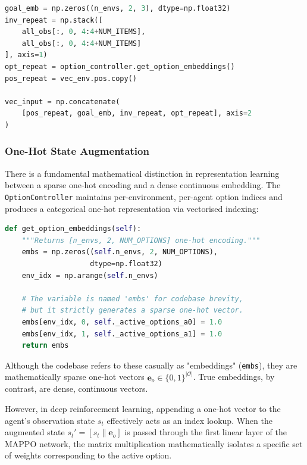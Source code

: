 \begin{lstlisting}[style=code, language=Python, caption={Observation construction in \texttt{hrl\_train\_loop.py}.}, label={lst:hrl_obs}]
goal_emb = np.zeros((n_envs, 2, 3), dtype=np.float32)
inv_repeat = np.stack([
    all_obs[:, 0, 4:4+NUM_ITEMS],
    all_obs[:, 0, 4:4+NUM_ITEMS]
], axis=1)
opt_repeat = option_controller.get_option_embeddings()
pos_repeat = vec_env.pos.copy()

vec_input = np.concatenate(
    [pos_repeat, goal_emb, inv_repeat, opt_repeat], axis=2
)
\end{lstlisting}

\subsubsection{One-Hot State Augmentation}

There is a fundamental mathematical distinction in representation learning between a sparse one-hot encoding and a dense continuous embedding. The \texttt{OptionController} maintains per-environment, per-agent option indices and produces a categorical one-hot representation via vectorised indexing:

\begin{lstlisting}[style=code, language=Python, caption={One-hot state augmentation in \texttt{option\_controller.py}.}, label={lst:onehot_gen}]
def get_option_embeddings(self):
    """Returns [n_envs, 2, NUM_OPTIONS] one-hot encoding."""
    embs = np.zeros((self.n_envs, 2, NUM_OPTIONS),
                    dtype=np.float32)
    env_idx = np.arange(self.n_envs)
    
    # The variable is named 'embs' for codebase brevity, 
    # but it strictly generates a sparse one-hot vector.
    embs[env_idx, 0, self._active_options_a0] = 1.0
    embs[env_idx, 1, self._active_options_a1] = 1.0
    return embs
\end{lstlisting}

Although the codebase refers to these casually as "embeddings" (\texttt{embs}), they are mathematically sparse one-hot vectors $\mathbf{e}_o \in \{0, 1\}^{|\mathcal{O}|}$. True embeddings, by contrast, are dense, continuous vectors. 

However, in deep reinforcement learning, appending a one-hot vector to the agent's observation state $s_t$ effectively acts as an index lookup. When the augmented state $s_t' = [s_t \parallel \mathbf{e}_{o}]$ is passed through the first linear layer of the MAPPO network, the matrix multiplication mathematically isolates a specific set of weights corresponding to the active option. 

